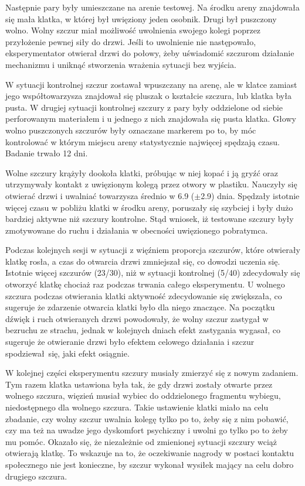 \documentclass{psychol}
\begin{document}
Następnie pary były umieszczane na arenie testowej. Na środku areny znajdowała się mała klatka, w której był uwięziony jeden osobnik. Drugi był puszczony wolno. Wolny szczur miał możliwość uwolnienia swojego kolegi poprzez przyłożenie pewnej siły do drzwi. Jeśli to uwolnienie nie następowało, eksperymentator otwierał drzwi do połowy, żeby uświadomić szczurom działanie mechanizmu i uniknąć stworzenia wrażenia sytuacji bez wyjścia.

W sytuacji kontrolnej szczur zostawał wpuszczany na arenę, ale w klatce zamiast jego współtowarzysza znajdował się pluszak o kształcie szczura, lub klatka była pusta. W drugiej sytuacji kontrolnej szczury z pary były oddzielone od siebie perforowanym materiałem i u jednego z nich znajdowała się pusta klatka. Głowy wolno puszczonych szczurów były oznaczane markerem po to, by móc kontrolować w którym miejscu areny statystycznie najwięcej spędzają czasu. Badanie trwało 12 dni.

Wolne szczury krążyły dookoła klatki, próbując w niej kopać i ją gryźć oraz utrzymywały kontakt z uwięzionym kolegą przez otwory w plastiku. Nauczyły się otwierać drzwi i uwalniać towarzysza średnio w 6.9 ($\pm$2.9) dnia. Spędzały istotnie więcej czasu w pobliżu klatki w środku areny, poruszały się szybciej i były dużo bardziej aktywne niż szczury kontrolne. Stąd wniosek, iż testowane szczury były zmotywowane do ruchu i działania w obecności uwięzionego pobratymca.

Podczas kolejnych sesji w sytuacji z więźniem proporcja szczurów, które otwierały klatkę rosła, a czas do otwarcia drzwi zmniejszał się, co dowodzi uczenia się. Istotnie więcej szczurów (23/30), niż w sytuacji kontrolnej (5/40) zdecydowały się otworzyć klatkę chociaż raz podczas trwania całego eksperymentu. U wolnego szczura podczas otwierania klatki aktywność zdecydowanie się zwiększała, co sugeruje że zdarzenie otwarcia klatki było dla niego znaczące. Na początku dźwięk i ruch otwieranych drzwi powodowały, że wolny szczur zastygał w bezruchu ze strachu, jednak w kolejnych dniach efekt zastygania wygasał, co sugeruje że otwieranie drzwi było efektem celowego działania i szczur spodziewał się, jaki efekt osiągnie.

W kolejnej części eksperymentu szczury musiały zmierzyć się z nowym zadaniem. Tym razem klatka ustawiona była tak, że gdy drzwi zostały otwarte przez wolnego szczura, więzień musiał wybiec do oddzielonego fragmentu wybiegu, niedostępnego dla wolnego szczura. Takie ustawienie klatki miało na celu zbadanie, czy wolny szczur uwalnia kolegę tylko po to, żeby się z nim pobawić, czy ma też na uwadze jego dyskomfort psychiczny i uwolni go tylko po to żeby mu pomóc. Okazało się, że niezależnie od zmienionej sytuacji szczury wciąż otwierają klatkę. To wskazuje na to, że oczekiwanie nagrody w postaci kontaktu społecznego nie jest konieczne, by szczur wykonał wysiłek mający na celu dobro drugiego szczura.
\end{document}
